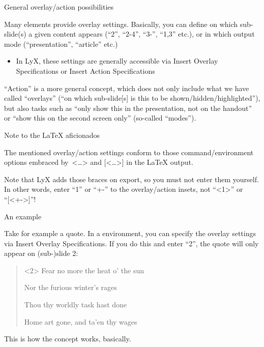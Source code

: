 \documentclass[english]{beamer}
\begin{document}
\begin{frame}{General overlay/action possibilities}

Many  elements provide overlay settings. Basically,
you can define on which sub-slide(s) a given content appears (``2'',
``2-4'', ``3-'', ``1,3'' etc.), or in which output mode (``presentation'',
``article'' etc.)
\begin{itemize}
\item In LyX, these settings are generally accessible via \alert{Insert \textrightarrow Overlay Specifications}
or \alert{Insert \textrightarrow Action Specifications}
\end{itemize}
\begin{overprint}
\begin{definition}
``Action'' is a more general concept, which does not only include
what we have called ``overlays'' (``on which sub-slide{[}s{]} is
this to be shown\slash hidden\slash highlighted''), but also tasks
such as ``only show this in the presentation, not on the handout''
or ``show this on the second screen only'' (so-called ``modes'').
\end{definition}

\begin{alertblock}{Note to the \LaTeX{} aficionados}

The mentioned overlay/action settings conform to those command/environment
options embraced by\alert{\ <\ldots >} and \alert{{[}<\ldots >{]}}
in the \LaTeX{} output.

Note that LyX adds those braces on export, so you must not enter
them yourself. In other words, enter ``1'' or ``+-'' to the overlay/action
insets, not ``<1>'' or ``{[}<+->{]}''!
\end{alertblock}
\end{overprint}
\end{frame}
%
\begin{frame}{An example}

Take for example a quote. In a  environment, you
can specify the overlay settings via \alert{Insert \textrightarrow Overlay Specifications}.
If you do this and enter ``2'', the quote will only appear on (sub-)slide
2:
\begin{quote}<2>
Fear no more the heat o\textquoteright{} the sun

Nor the furious winter\textquoteright s rages

Thou thy worldly task hast done

Home art gone, and ta\textquoteright en thy wages
\end{quote}
This is how the concept works, basically.
\end{frame}
\end{document}
